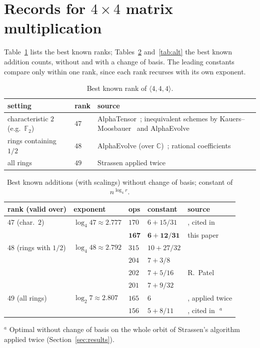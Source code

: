 \documentclass[11pt]{article}
\theoremstyle{remark}
\newcommand{\F}{\mathbb{F}}
\begin{document}
\section{Records for $4\times4$ matrix multiplication}\label{sec:records}

Table~\ref{tab:rank} lists the best known ranks; Tables~\ref{tab:flat}
and~\ref{tab:alt} the best known addition counts, without and with a
change of basis.  The leading constants compare only within one rank,
since each rank recurses with its own exponent.

\begin{table}[ht]
\centering
\caption{Best known rank of $\langle4,4,4\rangle$.}\label{tab:rank}
\begin{tabular}{llp{7.6cm}}
\toprule
setting & rank & source \\
\midrule
characteristic $2$ (e.g.\ $\F_2$) & $47$ & AlphaTensor~\cite{Fawzi22}; inequivalent
  schemes by Kauers--Moosbauer~\cite{KM23} and AlphaEvolve~\cite{Novikov25,DPSST26} \\
rings containing $1/2$ & $48$ & AlphaEvolve (over $\mathbb{C}$)~\cite{Novikov25};
  rational coefficients~\cite{DPS25} \\
all rings & $49$ & Strassen applied twice~\cite{Strassen69} \\
\bottomrule
\end{tabular}
\end{table}

\begin{table}[ht]
\centering
\caption{Best known additions (with scalings) without change of basis;
constant of $n^{\log_4 r}$.}\label{tab:flat}
\small
\begin{tabular}{lllll}
\toprule
rank (valid over) & exponent & ops & constant & source \\
\midrule
$47$ (char.\ $2$) & $\log_4 47\approx2.777$ & $170$ & $6+15/31$ & \cite{PLinOpt}, cited in~\cite{DPSST26} \\
                  &                       & $\mathbf{167}$ & $\mathbf{6+12/31}$ & this paper \\
$48$ (rings with $1/2$) & $\log_4 48\approx2.792$ & $315$ & $10+27/32$ & \cite{DPS25} \\
                  &                       & $204$ & $7+3/8$ & \cite{DPSST26} \\
                  &                       & $202$ & $7+5/16$ & R.~Patel~\cite{PLinOpt,Patel26} \\
                  &                       & $201$ & $7+9/32$ & \cite{Sidebottom26c,PLinOpt} \\
$49$ (all rings)  & $\log_2 7\approx2.807$ & $165$ & $6$ & \cite{Winograd71}, applied twice \\
                  &                       & $156$ & $5+8/11$ & \cite{PLinOpt}, cited in~\cite{DPSST26}\,$^{a}$ \\
\bottomrule
\end{tabular}

\smallskip
\footnotesize $^{a}$ Optimal without change of basis on the whole orbit
of Strassen's algorithm applied twice (Section~\ref{sec:results}).
\end{table}
\end{document}
